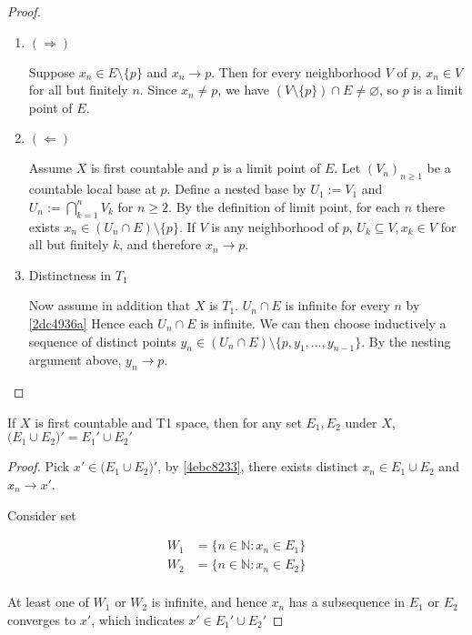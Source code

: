 \begin{proof}
    \begin{enumerate}
        \item $(\Rightarrow)$  
        
        Suppose 
        $x_n\in E\setminus\{p\}$ and $x_n\to p$. Then for every neighborhood $V$ of $p$,
        $x_n \in V$ for all but finitely $n$.
        Since $x_n\neq p$, we have $(V\setminus\{p\})\cap E\neq\varnothing$, so $p$ is a limit point of $E$.

        \item $(\Leftarrow)$ 
        
        Assume $X$ is first countable and $p$ is a limit point of $E$. 
        Let $(V_n)_{n\ge1}$ be a countable local base at $p$. 
        Define a nested base by $U_1:=V_1$ and $U_n:=\bigcap_{k=1}^n V_k$ for $n\ge2$. 
        By the definition of limit point, for each $n$ there exists $x_n\in (U_n\cap E)\setminus\{p\}$. 
        If $V$ is any neighborhood of $p$, $U_k \subseteq V, x_k \in V$ for all but finitely $k$, and therefore $x_n\to p$.

        \item Distinctness in $T_1$ 

        Now assume in addition that $X$ is $T_1$. 
        $U_n\cap E$ is infinite for every $n$ by \cref{2dc4936a}
        Hence each $U_n\cap E$ is infinite. 
        We can then choose inductively a sequence of distinct points $y_n\in (U_n\cap E)\setminus\{p,y_1,\dots,y_{n-1}\}$. 
        By the nesting argument above, $y_n\to p$.
    \end{enumerate}
\end{proof}


\begin{thm}
    If $X$ is first countable and T1 space, then for any set $E_1, E_2$ under $X$, $\big( E_1 \cup E_2 \big)' =  E_1' \cup E_2'$
\end{thm}


\begin{proof}
    Pick $x' \in \big( E_1 \cup E_2 \big)'$, by \cref{4ebc8233}, there exists distinct $x_n \in E_1 \cup E_2$
    and $x_n \to x'$.

    Consider set

    \begin{align*}
        W_1 &= \{ n \in \mathbb{N}: x_n \in E_1 \} \\
        W_2 &= \{ n \in \mathbb{N}: x_n \in E_2 \} \\
    \end{align*}

    At least one of $W_1$ or $W_2$ is infinite, and hence $x_n$ has a subsequence
    in $E_1$ or $E_2$
    converges to $x'$, which indicates $x' \in E_1' \cup E_2'$
\end{proof}

